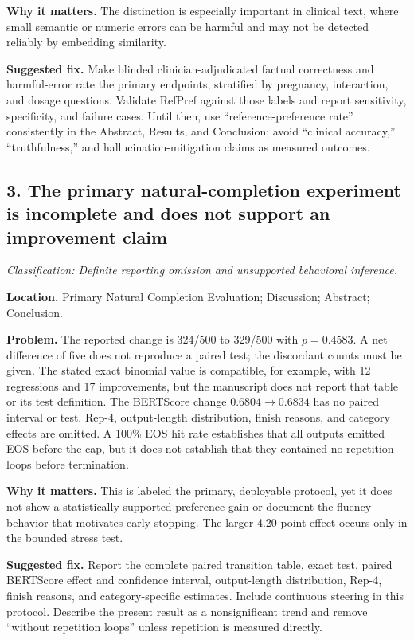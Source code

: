 \documentclass[11pt]{article}
\newcommand{\findinglabel}[1]{\textbf{#1}}
\newcommand{\classification}[1]{\textit{Classification: #1.}}
\begin{document}
\findinglabel{Why it matters.} The distinction is especially important in clinical text, where small semantic or numeric errors can be harmful and may not be detected reliably by embedding similarity.

\findinglabel{Suggested fix.} Make blinded clinician-adjudicated factual correctness and harmful-error rate the primary endpoints, stratified by pregnancy, interaction, and dosage questions.  Validate RefPref against those labels and report sensitivity, specificity, and failure cases.  Until then, use ``reference-preference rate'' consistently in the Abstract, Results, and Conclusion; avoid ``clinical accuracy,'' ``truthfulness,'' and hallucination-mitigation claims as measured outcomes.

\subsection*{3. The primary natural-completion experiment is incomplete and does not support an improvement claim}

\classification{Definite reporting omission and unsupported behavioral inference}

\findinglabel{Location.} Primary Natural Completion Evaluation; Discussion; Abstract; Conclusion.

\findinglabel{Problem.} The reported change is 324/500 to 329/500 with $p=0.4583$.  A net difference of five does not reproduce a paired test; the discordant counts must be given.  The stated exact binomial value is compatible, for example, with 12 regressions and 17 improvements, but the manuscript does not report that table or its test definition.  The BERTScore change $0.6804\rightarrow0.6834$ has no paired interval or test.  Rep-4, output-length distribution, finish reasons, and category effects are omitted.  A 100\% EOS hit rate establishes that all outputs emitted EOS before the cap, but it does not establish that they contained no repetition loops before termination.

\findinglabel{Why it matters.} This is labeled the primary, deployable protocol, yet it does not show a statistically supported preference gain or document the fluency behavior that motivates early stopping.  The larger 4.20-point effect occurs only in the bounded stress test.

\findinglabel{Suggested fix.} Report the complete paired transition table, exact test, paired BERTScore effect and confidence interval, output-length distribution, Rep-4, finish reasons, and category-specific estimates.  Include continuous steering in this protocol.  Describe the present result as a nonsignificant trend and remove ``without repetition loops'' unless repetition is measured directly.
\end{document}
